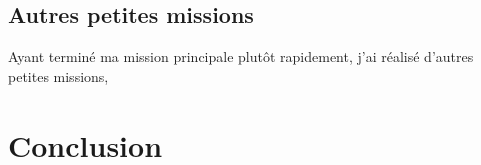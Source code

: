 \documentclass[a4paper,12pt]{report}
\begin{document}
\section{Autres petites missions}
Ayant terminé ma mission principale plutôt rapidement, j'ai réalisé d'autres petites missions, 


\chapter{Conclusion}
\end{document}
